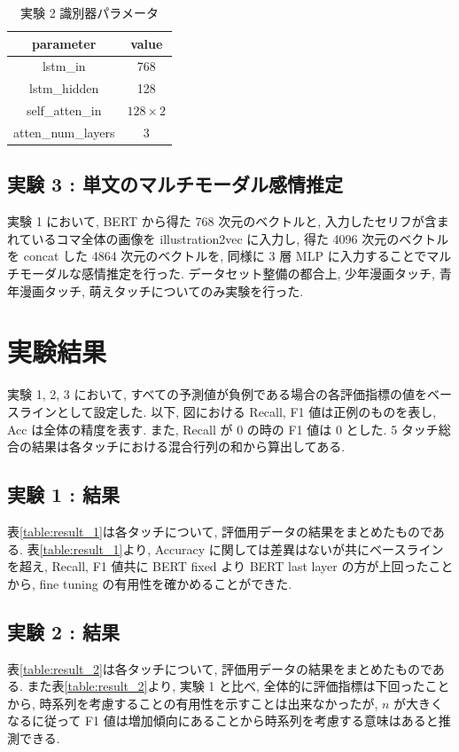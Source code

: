 \documentclass[twocolumn]{jarticle}     %
\begin{document}
\begin{table}[bht]
\begin{center}
\caption{実験 2 識別器パラメータ}
\begin{tabular}{|c|c|}
\hline
parameter & value \\ \hline
lstm\_in & 768   \\ \hline
lstm\_hidden    & 128    \\ \hline
self\_atten\_in & $128 \times 2$   \\ \hline
atten\_num\_layers & 3     \\ \hline
\end{tabular}
\label{tab:self_net}
\end{center}
\end{table}

\subsection{\small{実験 3 : 単文のマルチモーダル感情推定}}
実験 1 において, BERT から得た 768 次元のベクトルと, 入力したセリフが含まれているコマ全体の画像を illustration2vec に入力し, 得た 4096 次元のベクトルを concat した 4864 次元のベクトルを, 同様に 3 層 MLP に入力することでマルチモーダルな感情推定を行った. データセット整備の都合上, 少年漫画タッチ, 青年漫画タッチ, 萌えタッチについてのみ実験を行った.

\section{実験結果}
実験 1, 2, 3 において, すべての予測値が負例である場合の各評価指標の値をベースラインとして設定した. 以下, 図における Recall, F1 値は正例のものを表し, Acc は全体の精度を表す. また, Recall が 0 の時の F1 値は 0 とした. 5 タッチ総合の結果は各タッチにおける混合行列の和から算出してある.

\subsection{実験 1 : 結果}
表\ref{table:result_1}は各タッチについて, 評価用データの結果をまとめたものである.
表\ref{table:result_1}より, Accuracy に関しては差異はないが共にベースラインを超え, Recall, F1 値共に BERT fixed より BERT last layer の方が上回ったことから, fine tuning の有用性を確かめることができた.

\subsection{実験 2 : 結果}
表\ref{table:result_2}は各タッチについて, 評価用データの結果をまとめたものである.
また表\ref{table:result_2}より, 実験 1 と比べ, 全体的に評価指標は下回ったことから, 時系列を考慮することの有用性を示すことは出来なかったが, $n$ が大きくなるに従って F1 値は増加傾向にあることから時系列を考慮する意味はあると推測できる.
\end{document}
